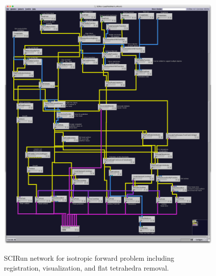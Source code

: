 \begin{figure}[p]
\begin{center}
\includegraphics[width=\textwidth]{Figures/iso_network.png}\\
\caption{SCIRun network for isotropic forward problem including registration, visualization, and flat tetrahedra removal.}
\label{fig:isofornet}
\end{center}
\end{figure}

